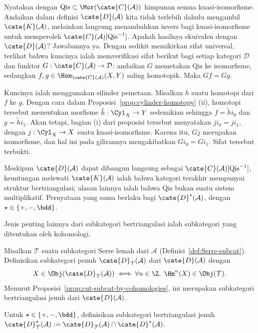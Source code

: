 \begin{catatan}
	Nyatakan dengan $\mathrm{Qis} \subset \Mor(\cate{C}(\mathcal{A}))$ himpunan
	semua kuasi-isomorfisme. Andaikan dalam definisi $\cate{D}(\mathcal{A})$
	kita tidak terlebih dahulu mengambil $\cate{K}(\mathcal{A})$, melainkan
	langsung menambahkan invers bagi kuasi-isomorfisme untuk memperoleh
	$\cate{C}(\mathcal{A})[\mathrm{Qis}^{-1}]$. Apakah hasilnya ekuivalen dengan
	$\cate{D}(\mathcal{A})$? Jawabannya ya. Dengan sedikit memikirkan sifat
	universal, terlihat bahwa kuncinya ialah memverifikasi sifat berikut bagi
	setiap kategori $\mathcal{D}$ dan funktor
	$G: \cate{C}(\mathcal{A}) \to \mathcal{D}$: andaikan $G$ memetakan
	$\mathrm{Qis}$ ke isomorfisme, sedangkan
	$f, g \in \Hom_{\cate{C}(\mathcal{A})}(X, Y)$ saling homotopik. Maka
	$Gf = Gg$.

	Kuncinya ialah menggunakan silinder pemetaan. Misalkan $h$ suatu homotopi
	dari $f$ ke $g$. Dengan cara dalam
	Proposisi~\ref{prop:cylinder-homotopy} (ii), homotopi tersebut menentukan
	morfisme $\tilde{h}: \Cyl_X \to Y$ sedemikian sehingga
	$f = \tilde{h} i_0$ dan $g = \tilde{h} i_1$. Akan tetapi, bagian (i) dari
	proposisi tersebut menyatakan $j i_0 = j i_1$, dengan
	$j: \Cyl_X \to X$ suatu kuasi-isomorfisme. Karena itu, $Gj$ merupakan
	isomorfisme, dan hal ini pada gilirannya mengakibatkan
	$G i_0 = G i_1$. Sifat tersebut terbukti.

	Meskipun $\cate{D}(\mathcal{A})$ dapat dibangun langsung sebagai
	$\cate{C}(\mathcal{A})[\mathrm{Qis}^{-1}]$, keuntungan melewati
	$\cate{K}(\mathcal{A})$ ialah bahwa kategori terakhir mempunyai struktur
	bertriangulasi; alasan lainnya ialah bahwa $\mathrm{Qis}$ bukan suatu sistem
	multiplikatif. Pernyataan yang sama berlaku bagi
	$\cate{D}^\star(\mathcal{A})$, dengan $\star \in \{+, -, \bdd\}$.
\end{catatan}

Jenis penting lainnya dari subkategori bertriangulasi ialah subkategori yang
ditentukan oleh kohomologi.

\begin{definisi}
	Misalkan $\mathcal{T}$ suatu subkategori Serre lemah dari $\mathcal{A}$
	(Definisi~\ref{def:Serre-subcat}). Definisikan subkategori penuh
	$\cate{D}_{\mathcal{T}}(\mathcal{A})$ dari $\cate{D}(\mathcal{A})$ dengan
	\[ X \in \Obj(\cate{D}_{\mathcal{T}}(\mathcal{A})) \iff \forall n \in \Z, \; \Hm^n(X) \in \Obj(\mathcal{T}). \]
	Menurut Proposisi~\ref{prop:cut-subcat-by-cohomologies}, ini merupakan
	subkategori bertriangulasi jenuh dari $\cate{D}(\mathcal{A})$.

	Untuk $\star \in \{+, -, \bdd\}$, definisikan subkategori bertriangulasi
	jenuh
	$\cate{D}^\star_{\mathcal{T}}(\mathcal{A}) := \cate{D}_{\mathcal{T}}(\mathcal{A}) \cap \cate{D}^\star(\mathcal{A})$.
\end{definisi}

